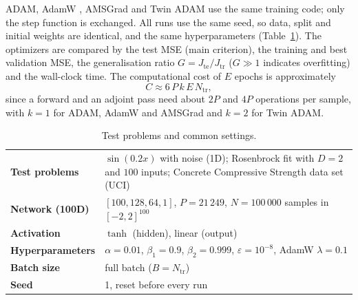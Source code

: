 \documentclass[11pt,a4paper]{article}
\begin{document}
ADAM, AdamW \cite{loshchilov2017decoupled}, AMSGrad \cite{reddi2018convergence} and Twin ADAM use the same training code; only the step function is exchanged. All runs use the same seed, so data, split and initial weights are identical, and the same hyperparameters (Table~\ref{tab:ann:setup}). The optimizers are compared by the test MSE (main criterion), the training and best validation MSE, the generalisation ratio $G = J_{\mathrm{te}}/J_{\mathrm{tr}}$ ($G\gg1$ indicates overfitting) and the wall-clock time. The computational cost of $E$ epochs is approximately
\begin{equation}
  C \approx 6\,P\,k\,E\,N_{\mathrm{tr}},
\end{equation}
since a forward and an adjoint pass need about $2P$ and $4P$ operations per sample, with $k=1$ for ADAM, AdamW and AMSGrad and $k=2$ for Twin ADAM.

\begin{table}[!htbp]
  \centering
  \caption{Test problems and common settings.}
  \label{tab:ann:setup}
  \begin{tabular}{lp{}}
    \toprule
    \textbf{Test problems} & $\sin(0.2x)$ with noise (1D); Rosenbrock fit with $D = 2$ and $100$ inputs; Concrete Compressive Strength data set (UCI) \\
    \textbf{Network (100D)} & $[100, 128, 64, 1]$, $P = 21\,249$, $N = 100\,000$ samples in $[-2,2]^{100}$ \\
    \textbf{Activation} & $\tanh$ (hidden), linear (output) \\
    \textbf{Hyperparameters} & $\alpha = 0.01$, $\beta_1 = 0.9$, $\beta_2 = 0.999$, $\varepsilon = 10^{-8}$, AdamW $\lambda = 0.1$ \\
    \textbf{Batch size} & full batch ($B = N_{\mathrm{tr}}$) \\
    \textbf{Seed} & 1, reset before every run \\
    \bottomrule
  \end{tabular}
\end{table}
\end{document}
